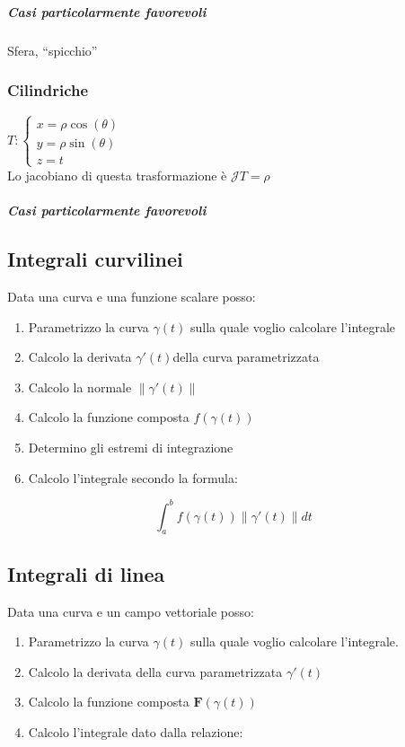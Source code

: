 \documentclass[10pt,a4paper]{report}
\newcommand{\norm}[1]{\left\lVert {#1} \right\rVert}
\begin{document}
				\subparagraph{Casi particolarmente favorevoli}
                Sfera, ``spicchio''
                
			\subsubsection{Cilindriche}
			$ T: \begin{cases} 
			x=\rho \cos(\theta) \\ 
			y=\rho \sin(\theta) \\
			z=t
			\end{cases} $
			\\
			Lo jacobiano di questa trasformazione è $\mathcal{J}T=\rho $
			
				\subparagraph{Casi particolarmente favorevoli}
		

		\subsection*{Integrali \textbf{curvilinei}}
			Data una curva e una funzione scalare posso:
			\begin{enumerate}
				\item Parametrizzo la curva $ \gamma(t) $ sulla quale voglio calcolare l'integrale
				\item Calcolo la derivata $ \gamma ' (t) $della curva parametrizzata
                \item Calcolo la normale $ \norm{\gamma '(t)} $
				\item Calcolo la funzione composta $ f(\gamma (t)) $
				\item Determino gli estremi di integrazione
				\item Calcolo l'integrale secondo la formula:
			\end{enumerate}
		
		\[ \int_{a}^{b} f(\gamma (t)) \norm{\gamma '(t)} dt\]
		
		
		\subsection*{Integrali di \textbf{linea}}
		Data una curva e un campo vettoriale posso:
			\begin{enumerate}
				\item Parametrizzo la curva $ \gamma(t) $ sulla quale voglio calcolare l'integrale. 
				\item Calcolo la derivata della curva parametrizzata $ \gamma ' (t) $ 
				\item Calcolo la funzione composta $ \mathbf{F}(\gamma (t)) $
				\item Calcolo l'integrale dato dalla relazione:
				\end{enumerate}
			
\end{document}
